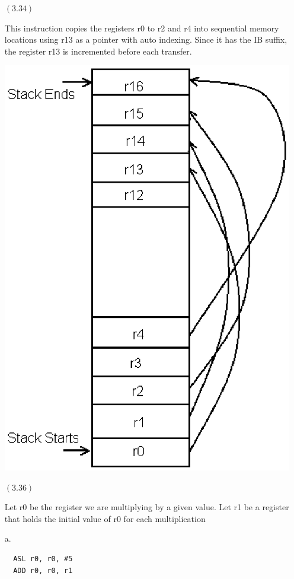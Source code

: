 \documentclass[letterpaper,10pt,titlepage]{article}
\begin{document}
\begin{enumerate}
\item[$(3.34)$]

  This instruction copies the registers r0 to r2 and r4 into sequential memory locations using r13 as a pointer with auto indexing. 
  Since it has the IB suffix, the register r13 is incremented before each transfer.


\includegraphics[scale=.5]{stack.eps}


\item[$(3.36)$] 

  Let r0 be the register we are multiplying by a given value.
  Let r1 be a register that holds the initial value of r0 for each multiplication
  
  a. 
  \begin{lstlisting}
  ASL r0, r0, #5
  ADD r0, r0, r1
  \end{lstlisting}
  

\end{enumerate}
\end{document}
